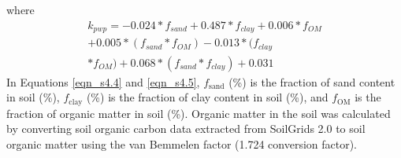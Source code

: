 \noindent where
\begin{equation}
    \label{eqn_s4.5} \tag{C$_4$.5}
    \begin{aligned}
        k_{pwp} = -0.024 * f_{sand} + 0.487 * f_{clay} + 0.006 * f_{OM} \\ + 0.005 * (f_{sand} * f_{OM}) - 0.013 * (f_{clay} \\ * f_{OM}) + 0.068 * (f_{sand} * f_{clay}) + 0.031
    \end{aligned}
\end{equation}
\noindent In Equations \ref{eqn_s4.4} and \ref{eqn_s4.5}, $f_\mathrm{sand}$ (\%) is the fraction of sand content in soil (\%), $f_\mathrm{clay}$ (\%) is the fraction of clay content in soil (\%), and $f_\mathrm{OM}$ is the fraction of organic matter in soil (\%). Organic matter in the soil was calculated by converting soil organic carbon data extracted from SoilGrids 2.0 to soil organic matter using the van Bemmelen factor (1.724 conversion factor).
\clearpage


